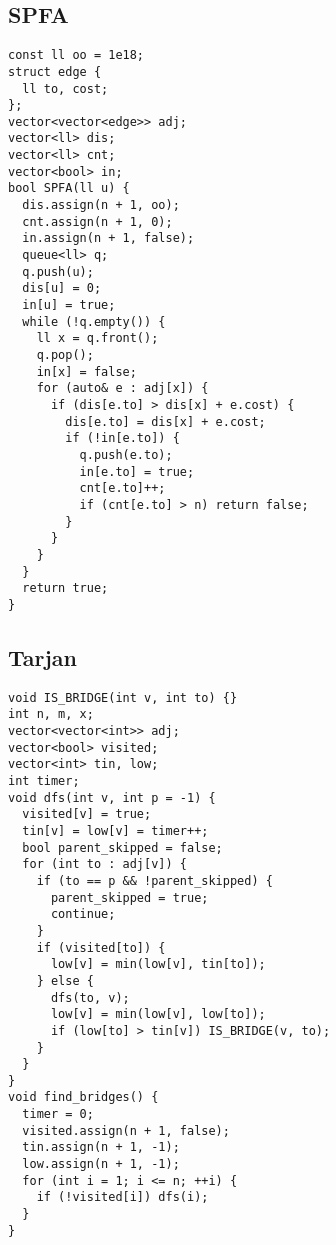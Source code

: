 \documentclass[twoside]{article}
\begin{document}
\begin{multicols*}{2}
{
\subsection*{SPFA}
}
\begin{verbatim}
const ll oo = 1e18;
struct edge {
  ll to, cost;
};
vector<vector<edge>> adj;
vector<ll> dis;
vector<ll> cnt;
vector<bool> in;
bool SPFA(ll u) {
  dis.assign(n + 1, oo);
  cnt.assign(n + 1, 0);
  in.assign(n + 1, false);
  queue<ll> q;
  q.push(u);
  dis[u] = 0;
  in[u] = true;
  while (!q.empty()) {
    ll x = q.front();
    q.pop();
    in[x] = false;
    for (auto& e : adj[x]) {
      if (dis[e.to] > dis[x] + e.cost) {
        dis[e.to] = dis[x] + e.cost;
        if (!in[e.to]) {
          q.push(e.to);
          in[e.to] = true;
          cnt[e.to]++;
          if (cnt[e.to] > n) return false;
        }
      }
    }
  }
  return true;
}

\end{verbatim}

{
\subsection*{Tarjan}
}
\begin{verbatim}
void IS_BRIDGE(int v, int to) {}
int n, m, x;
vector<vector<int>> adj;
vector<bool> visited;
vector<int> tin, low;
int timer;
void dfs(int v, int p = -1) {
  visited[v] = true;
  tin[v] = low[v] = timer++;
  bool parent_skipped = false;
  for (int to : adj[v]) {
    if (to == p && !parent_skipped) {
      parent_skipped = true;
      continue;
    }
    if (visited[to]) {
      low[v] = min(low[v], tin[to]);
    } else {
      dfs(to, v);
      low[v] = min(low[v], low[to]);
      if (low[to] > tin[v]) IS_BRIDGE(v, to);
    }
  }
}
void find_bridges() {
  timer = 0;
  visited.assign(n + 1, false);
  tin.assign(n + 1, -1);
  low.assign(n + 1, -1);
  for (int i = 1; i <= n; ++i) {
    if (!visited[i]) dfs(i);
  }
}
\end{verbatim}


\end{multicols*}
\end{document}
